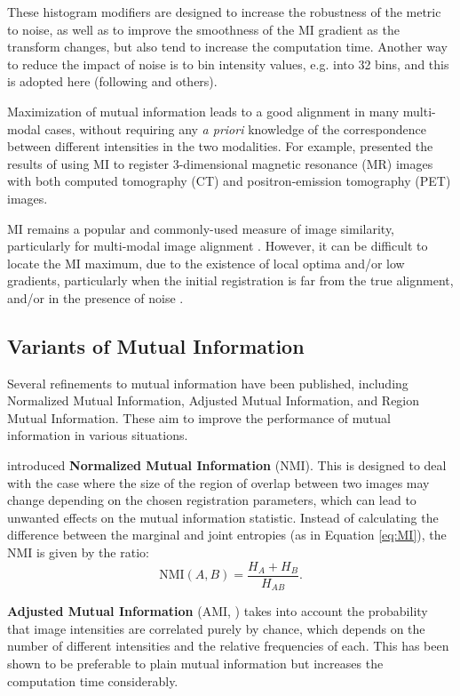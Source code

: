 \documentclass{report}
\begin{document}
These histogram modifiers are designed to increase the robustness of the metric to noise, as well as to improve the smoothness of the MI gradient as the transform changes, but also tend to increase the computation time. Another way to reduce the impact of noise is to bin intensity values, e.g. into 32 bins, and this is adopted here (following \cite{gee2003biomedical} and others).

Maximization of mutual information leads to a good alignment in many multi-modal cases, without requiring any \textit{a priori} knowledge of the correspondence between different intensities in the two modalities. For example, \cite{wells1996multi} presented the results of using MI to register 3-dimensional magnetic resonance (MR) images with both computed tomography (CT) and positron-emission tomography (PET) images. 

MI remains a popular and commonly-used measure of image similarity, particularly for multi-modal image alignment \citep{oliveira2014medical}. However, it can be difficult to locate the MI maximum, due to the existence of local optima and/or low gradients, particularly when the initial registration is far from the true alignment, and/or in the presence of noise \citep{maes1997multimodality}.

\subsection{Variants of Mutual Information}
Several refinements to mutual information have been published, including Normalized Mutual Information, Adjusted Mutual Information, and Region Mutual Information. These aim to improve the performance of mutual information in various situations.

\cite{studholme1999overlap} introduced \textbf{Normalized Mutual Information} (NMI). This is designed to deal with the case where the size of the region of overlap between two images may change depending on the chosen registration parameters, which can lead to unwanted effects on the mutual information statistic. Instead of calculating the difference between the marginal and joint entropies (as in Equation \ref{eq:MI}), the NMI is given by the ratio:
\begin{equation}
\text{NMI}(A,B) = \frac{H_A + H_B}{H_{AB}}.
\label{eq:NMI}
\end{equation}

\textbf{Adjusted Mutual Information} (AMI, \cite{vinh2009information}) takes into account the probability that image intensities are correlated purely by chance, which depends on the number of different intensities and the relative frequencies of each. This has been shown to be preferable to plain mutual information \citep{vinh2009information} but increases the computation time considerably.
\end{document}

